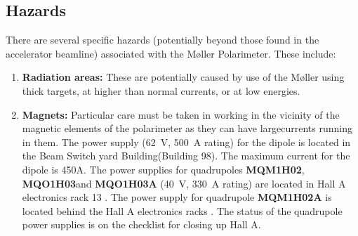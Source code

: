 \begin{safetyen}{0}{0}
%
%
\label{sec:moller_safety}
\vspace{-\parskip}

\subsection{Hazards}
There are several specific hazards (potentially beyond those found in
the accelerator beamline) associated with the M\o ller Polarimeter.
These include:
\begin{enumerate}
\item{{\bf Radiation areas:} These are potentially caused by use of the M\o ller using thick targets, at higher than normal currents, or at low energies.}
\item{{\bf Magnets:}
\vspace{-\parskip}
Particular care must be taken in working in the vicinity of the magnetic elements of the polarimeter as they can have largecurrents running in them. The power supply (62~V, 500~A rating) for the dipole is located in the Beam Switch yard Building(Building 98). The maximum current for the dipole is 450A. The power supplies for quadrupoles {\bf MQM1H02}, {\bf MQO1H03}and {\bf MQO1H03A} (40~V, 330~A rating) are located in Hall A electronics rack 13 
. The power supply for quadrupole {\bf MQM1H02A} is 
located behind the Hall A electronics racks 
.
The status of the quadrupole power supplies is on the  checklist for closing up Hall A. 




}
\end{enumerate}
\end{safetyen}

